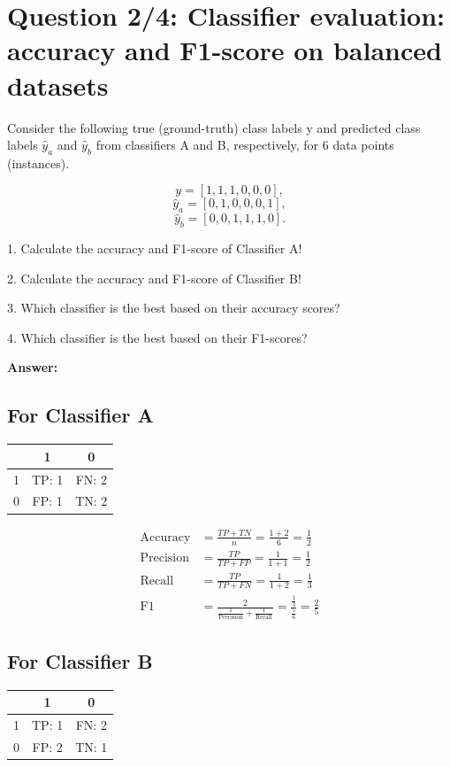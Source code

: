 \documentclass[12pt,a4paper]{article}
\begin{document}
\section*{Question 2/4: Classifier evaluation: accuracy and F1-score on balanced datasets}

Consider the following true (ground-truth) class labels y and predicted class labels $\hat{y}_a$ and $\hat{y}_b$ from
classifiers A and B, respectively, for 6 data points (instances).

\[
  y = [1, 1, 1, 0, 0, 0],
\]
\[
  \hat{y}_a = [0, 1, 0, 0, 0, 1],
\]
\[
  \hat{y}_b = [0, 0, 1, 1, 1, 0].
\]

1. Calculate the accuracy and F1-score of Classifier A!

2. Calculate the accuracy and F1-score of Classifier B!

3. Which classifier is the best based on their accuracy scores?

4. Which classifier is the best based on their F1-scores?

\textbf{Answer:}

\subsection*{For Classifier A}
\begin{table}[H]
  \centering
  \begin{tabular}{ccc}
    \toprule
      & 1     & 0     \\
    \midrule
    1 & TP: 1 & FN: 2 \\
    0 & FP: 1 & TN: 2 \\
    \bottomrule
  \end{tabular}
\end{table}

\begin{align*}
  \text{Accuracy}  & = \frac{TP+TN}{n} = \frac{1+2}{6} = \frac{1}{2}                \\
  \text{Precision} & = \frac{TP}{TP + FP} = \frac{1}{1+1} = \frac{1}{2}             \\
  \text{Recall}    & = \frac{TP}{TP+FN} = \frac{1}{1+2} = \frac{1}{3}               \\
  \text{F1}        & = \frac{2}{\frac{1}{\text{Precision}}+\frac{1}{\text{Recall}}}
  = \frac{\frac{1}{3}}{\frac{5}{6}} = \frac{2}{5}
\end{align*}

\subsection*{For Classifier B}
\begin{table}[H]
  \centering
  \begin{tabular}{ccc}
    \toprule
      & 1     & 0     \\
    \midrule
    1 & TP: 1 & FN: 2 \\
    0 & FP: 2 & TN: 1 \\
    \bottomrule
  \end{tabular}
\end{table}
\end{document}
